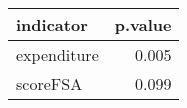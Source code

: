 \begin{table}[!h]
\centering
\begin{tabular}[t]{lr}
\toprule
indicator & p.value\\
\midrule
expenditure & 0.005\\
scoreFSA & 0.099\\
\bottomrule
\end{tabular}
\end{table}
